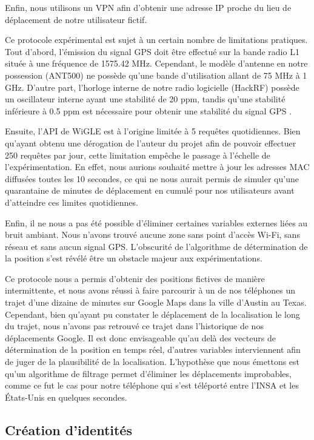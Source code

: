 \documentclass[runningheads]{llncs}
\begin{document}
Enfin, nous utilisons un VPN afin d'obtenir une adresse IP proche du lieu de déplacement de notre utilisateur fictif.

Ce protocole expérimental est sujet à un certain nombre de limitations pratiques. 
Tout d'abord, l'émission du signal GPS doit être effectué sur la bande radio L1 située à une fréquence de 1575.42 MHz. Cependant, le modèle d'antenne en notre possession (ANT500) ne possède qu'une bande d'utilisation allant de 75 MHz à 1 GHz. D'autre part, l'horloge interne de notre radio logicielle (HackRF) possède un oscillateur interne ayant une stabilité de 20 ppm, tandis qu'une stabilité inférieure à 0.5 ppm est nécessaire pour obtenir une stabilité du signal GPS \cite{kao_miniature_2014}.

Ensuite, l'API de WiGLE est à l'origine limitée à 5 requêtes quotidiennes. Bien qu'ayant obtenu une dérogation de l'auteur du projet afin de pouvoir effectuer 250 requêtes par jour, cette limitation empêche le passage à l'échelle de l'expérimentation. En effet, nous aurions souhaité mettre à jour les adresses MAC diffusées toutes les 10 secondes, ce qui ne nous aurait permis de simuler qu'une quarantaine de minutes de déplacement en cumulé pour nos utilisateurs avant d'atteindre ces limites quotidiennes.

Enfin, il ne nous a pas été possible d'éliminer certaines variables externes liées au bruit ambiant. Nous n'avons trouvé aucune zone sans point d'accès Wi-Fi, sans réseau et sans aucun signal GPS. L'obscurité de l'algorithme de détermination de la position s'est révélé être un obstacle majeur aux expérimentations. 

Ce protocole nous a permis d'obtenir des positions fictives de manière intermittente, et nous avons réussi à faire parcourir à un de nos téléphones un trajet d'une dizaine de minutes sur Google Maps dans la ville d'Austin au Texas. Cependant, bien qu'ayant pu constater le déplacement de la localisation le long du trajet, nous n'avons pas retrouvé ce trajet dans l'historique de nos déplacements Google. Il est donc envisageable qu'au delà des vecteurs de détermination de la position en temps réel, d'autres variables interviennent afin de juger de la plausibilité de la localisation. L'hypothèse que nous émettons est qu'un algorithme de filtrage permet d'éliminer les déplacements improbables, comme ce fut le cas pour notre téléphone qui s'est téléporté entre l'INSA et les États-Unis en quelques secondes.


\subsection{Création d'identités}
\end{document}
